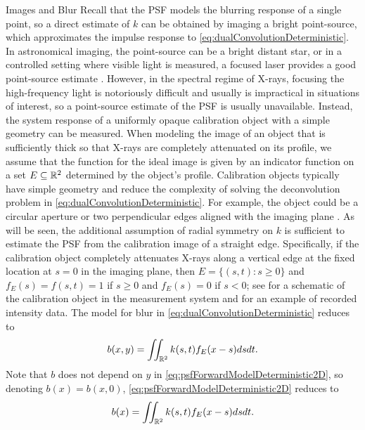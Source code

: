 \begin{chapter}{Images and Blur}
  Recall that the PSF models the blurring response of a single point, so a direct estimate of $k$ can be obtained by imaging a bright point-source, which approximates the impulse response to \eqref{eq:dualConvolutionDeterministic}.
  In astronomical imaging, the point-source can be a bright distant star, or in a controlled setting where visible light is measured, a focused laser provides a good point-source estimate \citep{tomaney1996expanding}.
  However, in the spectral regime of X-rays, focusing the high-frequency light is notoriously difficult and usually is impractical in situations of interest, so a point-source estimate of the PSF is usually unavailable. %
  Instead, the system response of a uniformly opaque calibration object with a simple geometry can be measured.
  When modeling the image of an object that is sufficiently thick so that X-rays are completely attenuated on its profile, we assume that the function for the ideal image is given by an indicator function on a set $E \subseteq \mathbb R^2$ determined by the object's profile.
  Calibration objects typically have simple geometry and reduce the complexity of solving the deconvolution problem in \eqref{eq:dualConvolutionDeterministic}.  
  For example, the object could be a circular aperture or two perpendicular edges aligned with the imaging plane \citep{doering1992,watson1993}.
  As will be seen, the additional assumption of radial symmetry on $k$ is sufficient to estimate the PSF from the calibration image of a straight edge. 
  Specifically, if the calibration object completely attenuates X-rays along a vertical edge at the fixed location at $s=0$ in the imaging plane, then $E=\{(s,t):s\ge0\}$ and $f_E(s) = f(s,t) = 1$ if $s\ge0$ and $f_E(s)=0$ if $s <0$; see  for a schematic of the calibration object in the measurement system and  for an example of recorded intensity data.
  The model for blur in \eqref{eq:dualConvolutionDeterministic} reduces to
\begin{equation}\label{eq:psfForwardModelDeterministic2D}
  b(x,y) = \iint_{\mathbb R^2} k(s,t) f_E(x-s)dsdt. 
\end{equation}
  Note that $b$ does not depend on $y$ in \eqref{eq:psfForwardModelDeterministic2D}, so denoting $b(x) = b(x,0)$, \eqref{eq:psfForwardModelDeterministic2D} reduces to
\begin{equation}\label{eq:psfForwardModelDeterministic}
  b(x) = \iint_{\mathbb R^2} k(s,t) f_E(x-s)dsdt. 
\end{equation} 
  

\end{chapter}
